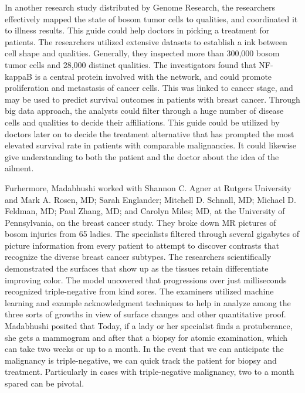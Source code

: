 \documentclass[sigconf]{acmart}
\begin{document}
In another research study distributed by Genome Research, the researchers effectively mapped the state of bosom tumor cells to qualities, and coordinated it to illness results\cite{breiman1996bagging}. This guide could help doctors in picking a treatment for patients. The researchers utilized extensive datasets to establish a ink between cell shape and qualities. Generally, they inspected more than 300,000 bosom tumor cells and 28,000 distinct qualities\cite{breiman1996bagging}.
The investigators found that NF-kappaB is a central protein involved with the network, and could promote proliferation and metastasis of cancer cells. This was linked to cancer stage, and may be used to predict survival outcomes in patients with breast cancer. Through big data approach, the analysts could filter through a huge number of disease cells and qualities to decide their affiliations. This guide could be utilized by doctors later on to decide the treatment alternative that has prompted the most elevated survival rate in patients with comparable malignancies. It could likewise give understanding to both the patient and the doctor about the idea of the ailment.

Furhermore, Madabhushi worked with Shannon C. Agner at Rutgers University and Mark A. Rosen, MD; Sarah Englander; Mitchell D. Schnall, MD; Michael D. Feldman, MD; Paul Zhang, MD; and Carolyn Miles; MD, at the University of Pennsylvania, on the breast cancer study.
They broke down MR pictures of bosom injuries from 65 ladies. The specialists filtered through several gigabytes of picture information from every patient to attempt to discover contrasts that recognize the diverse breast cancer subtypes.
The researchers scientifically demonstrated the surfaces that show up as the tissues retain differentiate improving color. The model uncovered that progressions over just milliseconds recognized triple-negative from kind sores. The examiners utilized machine learning and example acknowledgment techniques to help in analyze among the three sorts of growths in view of surface changes and other quantitative proof\cite{wamba2015big}.
Madabhushi posited that Today, if a lady or her specialist finds a protuberance, she gets a mammogram and after that a biopsy for atomic examination, which can take two weeks or up to a month. In the event that we can anticipate the malignancy is triple-negative, we can quick track the patient for biopsy and treatment. Particularly in cases with triple-negative malignancy, two to a month spared can be pivotal\cite{wamba2015big}.
\end{document}
